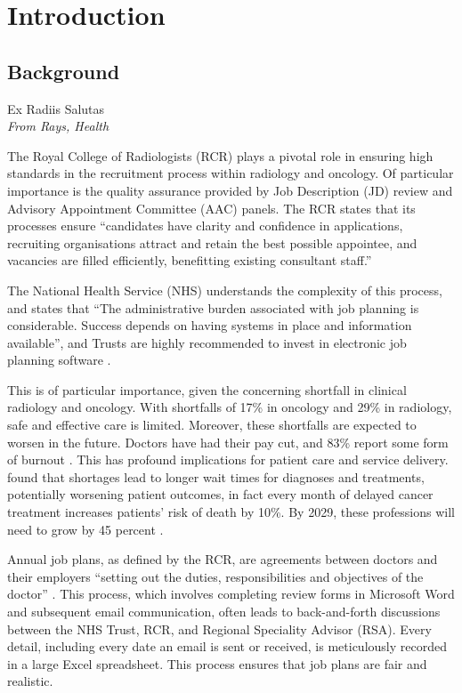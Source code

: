 \chapter{Introduction}
\section{Background} \label{Background}
\epigraph{Ex Radiis Salutas\\\textit{From Rays, Health}}{}
The Royal College of Radiologists (RCR) plays a pivotal role in ensuring high standards in the recruitment process within radiology and oncology. Of particular importance is the quality assurance provided by Job Description (JD) review and Advisory Appointment Committee (AAC) panels. The RCR states that its processes ensure “candidates have clarity and confidence in applications, recruiting organisations attract and retain the best possible appointee, and vacancies are filled efficiently, benefitting existing consultant staff.” \parencite{the_royal_college_of_radiologists_clinical_2022} 

The National Health Service (NHS) understands the complexity of this process, and states that “The administrative burden associated with job planning is considerable. Success depends on having systems in place and information available”, and Trusts are highly recommended to invest in electronic job planning software \parencite{national_health_service_consultant_2017}.

This is of particular importance, given the concerning shortfall in clinical radiology and oncology. With shortfalls of 17\% in oncology and 29\% in radiology, safe and effective care is limited. Moreover, these shortfalls are expected to worsen in the future. Doctors have had their pay cut, and 83\% report some form of burnout \parencite{the_royal_college_of_radiologists_rcr_2023}. This has profound implications for patient care and service delivery. \textcite{limb_shortages_2022} found that shortages lead to longer wait times for diagnoses and treatments, potentially worsening patient outcomes, in fact every month of delayed cancer treatment increases patients’ risk of death by 10\%. By 2029, these professions will need to grow by 45 percent \parencite{national_health_service_strategic_2018}.

Annual job plans, as defined by the RCR, are agreements between doctors and their employers “setting out the duties, responsibilities and objectives of the doctor” \parencite{the_royal_college_of_radiologists_clinical_2022}. This process, which involves completing review forms in Microsoft Word and subsequent email communication, often leads to back-and-forth discussions between the NHS Trust, RCR, and Regional Speciality Advisor (RSA). Every detail, including every date an email is sent or received, is meticulously recorded in a large Excel spreadsheet. This process ensures that job plans are fair and realistic.

